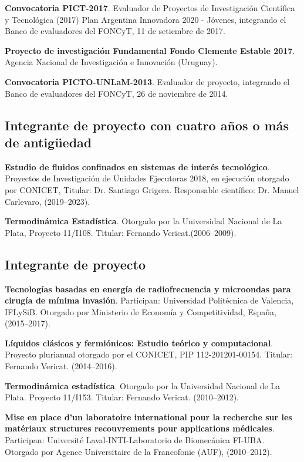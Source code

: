 \documentclass[margin,line]{res}
\begin{document}
\begin{resume}
{\bf Convocatoria PICT-2017}. Evaluador de Proyectos de Investigación Científica y Tecnológica (2017) Plan Argentina Innovadora 2020 - Jóvenes, integrando el Banco de evaluadores del FONCyT, 11 de setiembre de 2017.

{\bf Proyecto de investigación Fundamental Fondo Clemente Estable 2017}. Agencia Nacional de Investigación e Innovación (Uruguay).

{\bf Convocatoria PICTO-UNLaM-2013}. Evaluador de proyecto, integrando el Banco de evaluadores del FONCyT, 26 de noviembre de 2014.

\subsection{ Integrante de proyecto con cuatro años o más de antigüedad}

\textbf{Estudio de fluidos confinados en sistemas de interés tecnológico}. Proyectos de Investigación de Unidades Ejecutoras 2018, en ejecución otorgado por CONICET, Titular: Dr. Santiago Grigera. Responsable científico: Dr. Manuel Carlevaro, (2019--2023). 

\textbf{Termodinámica Estadística}. Otorgado por la Universidad Nacional de La Plata, Proyecto 11/I108. Titular: Fernando Vericat.(2006--2009). 

\subsection{ Integrante de proyecto}

\textbf{Tecnologías basadas en energía de radiofrecuencia y microondas para cirugía de mínima invasión}. Participan: Universidad Politécnica de Valencia, IFLySiB. Otorgado por Ministerio de Economía y Competitividad, España, (2015--2017).

\textbf{Líquidos clásicos y fermiónicos: Estudio teórico y computacional}. Proyecto plurianual otorgado por el CONICET, PIP 112-201201-00154. Titular: Fernando Vericat. (2014--2016).

\textbf{Termodinámica estadística}. Otorgado por la Universidad Nacional de La Plata. Proyecto 11/I153. Titular: Fernando Vericat. (2010--2012). 

\textbf{Mise en place d’un laboratoire international pour la recherche sur les matériaux structures recouvrements pour applications médicales}. Participan: Université Laval-INTI-Laboratorio de Biomecánica FI-UBA. Otorgado por Agence Universitaire de la Francofonie (AUF), (2010--2012).


\end{resume}
\end{document}
